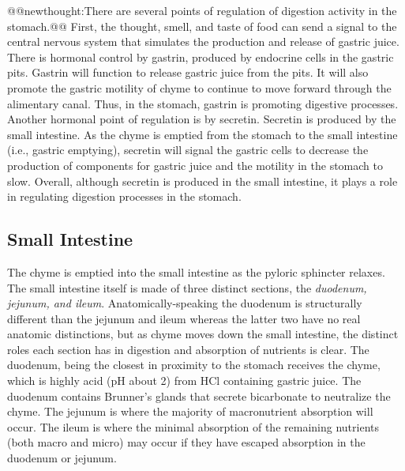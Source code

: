 \documentclass{tufte-handout}
\makeatletter
\def\newthought#1{@@newthought:#1@@}
\makeatother
\begin{document}
\newthought{There are several points of regulation of digestion activity in the stomach.} First, the thought, smell, and taste of food can send a signal to the central nervous system that simulates the production and release of gastric juice. There is hormonal control by gastrin, produced by endocrine cells in the gastric pits. Gastrin will function to release gastric juice from the pits. It will also promote the gastric motility of chyme to continue to move forward through the alimentary canal. Thus, in the stomach, gastrin is promoting digestive processes. Another hormonal point of regulation is by secretin. Secretin is produced by the small intestine. As the chyme is emptied from the stomach to the small intestine (i.e., gastric emptying), secretin will signal the gastric cells to decrease the production of components for gastric juice and the motility in the stomach to slow. Overall, although secretin is produced in the small intestine, it plays a role in regulating digestion processes in the stomach.

\subsection{Small Intestine}
The chyme is emptied into the small intestine as the pyloric sphincter relaxes. The small intestine itself is made of three distinct sections, the \emph{duodenum, jejunum, and ileum}. Anatomically-speaking the duodenum is structurally different than the jejunum and ileum whereas the latter two  have no real anatomic distinctions, but as chyme moves down the small intestine, the distinct roles each section has in digestion and absorption of nutrients is clear. The duodenum, being the closest in proximity to the stomach receives the chyme, which is highly acid (pH about 2) from HCl containing gastric juice. The duodenum contains Brunner's glands that secrete bicarbonate to neutralize the chyme. The jejunum is where the majority of macronutrient absorption will occur. The ileum is where the minimal absorption of the remaining nutrients (both macro and micro) may occur if they have escaped absorption in the duodenum or jejunum. 
\end{document}
